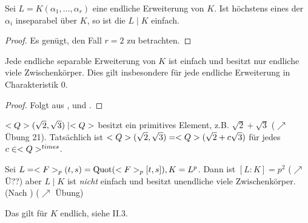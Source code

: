 \begin{theorem}
	Sei $L = K(\alpha_1, \dots, \alpha_r)$ eine endliche Erweiterung von $K$. Ist höchstens eines der $\alpha_i$ inseparabel über $K$, so ist die $L \mid K$ einfach.
\end{theorem}
\begin{proof}
	Es genügt, den Fall $r = 2$ zu betrachten. %
\end{proof}
\begin{conclusion}
	Jede endliche separable Erweiterung von $K$ ist einfach und besitzt nur endliche viele Zwischenkörper. Dies gilt insbesondere für jede endliche Erweiterung in Charakteristik 0.
\end{conclusion}
\begin{proof}
	Folgt aus ,  und .
\end{proof}
\begin{example}
	$<Q>(\sqrt{2}, \sqrt{3})\mid <Q>$ besitzt ein primitives Element, z.B. $\sqrt{2} + \sqrt{3}$ ($\nearrow$ Übung 21). Tatsächlich ist $<Q>(\sqrt{2}, \sqrt{3}) = <Q>(\sqrt{2}+c\sqrt{3})$ für jedes $c \in <Q>^{times}$.
\end{example}
\begin{example}
	Sei $L = <F>_p(t,s) = \operatorname{Quot}(<F>_p[t,s]), K = L^p$. Dann ist $[L:K] = p^2$ ($\nearrow$ Ü??) aber $L\mid K$ ist \emph{nicht} einfach und besitzt unendliche viele Zwischenkörper. (Nach ) ($\nearrow$ Übung)
\end{example}
\begin{remark}
	Das  gilt für $K$ endlich, siehe II.3. %
\end{remark}